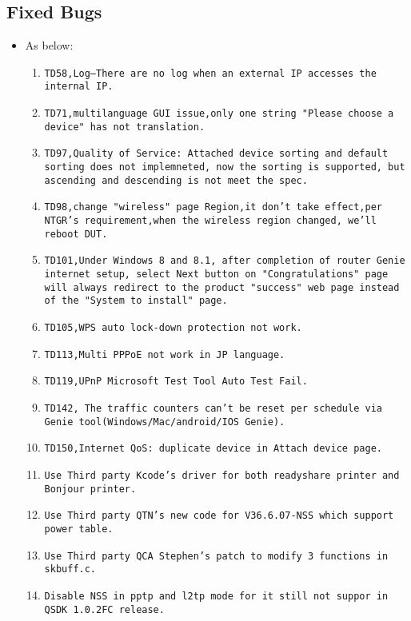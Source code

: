 \documentclass[12pt]{report}
\begin{document}
    \subsection{Fixed Bugs}
    \begin{itemize}
    \item As below:
    	\begin{enumerate}
		\item \texttt{TD58,Log--There are no log when an external IP accesses the internal IP.}
		\item \texttt{TD71,multilanguage GUI issue,only one string "Please choose a device" has not translation.}
		\item \texttt{TD97,Quality of Service: Attached device sorting and default sorting does not implemneted, now the sorting is supported, but ascending and descending is not meet the spec.}
		\item \texttt{TD98,change "wireless" page Region,it don't take effect,per NTGR's requirement,when the wireless region changed, we'll reboot DUT.}
		\item \texttt{TD101,Under Windows 8 and 8.1, after completion of router Genie internet setup, select Next button on "Congratulations" page will always redirect to the product "success" web page instead of the "System to install" page.}
		\item \texttt{TD105,WPS auto lock-down protection not work.}
		\item \texttt{TD113,Multi PPPoE not work in JP language.}
		\item \texttt{TD119,UPnP Microsoft Test Tool Auto Test Fail.}
		\item \texttt{TD142, The traffic counters can't be reset per schedule via Genie tool(Windows/Mac/android/IOS Genie).}
		\item \texttt{TD150,Internet QoS: duplicate device in Attach device page.}
		\item \texttt{Use Third party Kcode's driver for both readyshare printer and Bonjour printer.}
		\item \texttt{Use Third party QTN's new code for V36.6.07-NSS which support power table.}
		\item \texttt{Use Third party QCA Stephen's patch to modify 3 functions in skbuff.c.}
		\item \texttt{Disable NSS in pptp and l2tp mode for it still not suppor in QSDK 1.0.2FC release.}
    	\end{enumerate}
    \end{itemize}
\end{document}
